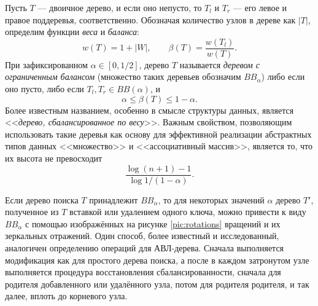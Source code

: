 \documentclass[a4paper,14pt]{extarticle}
\begin{document}
Пусть \( T \) --- двоичное дерево,
и  если оно непусто, то
\( T_l \) и \( T_r \) ---
его левое и правое поддеревья, соответственно.
Обозначая количество узлов в дереве как \( |T| \),
определим функции \emph{веса} и \emph{баланса}:
\begin{equation}
  w(T) = 1 + |W|, \qquad
  \beta(T) = \frac{w(T_l)}{w(T)}.
\end{equation}
При зафиксированном \( \alpha \in [0, 1/2] \),
дерево \( T \) называется
\emph{деревом с ограниченным балансом}
(множество таких деревьев обозначим \( BB_\alpha \))
либо если оно пусто,
либо если \( T_l, T_r \in BB(\alpha) \),
и
\begin{equation}
  \label{eqn:beta}
  \alpha \leqslant \beta(T) \leqslant 1 - \alpha.
\end{equation}
Более известным названием,
особенно в смысле структуры данных,
является <<\emph{дерево, сбалансированное по весу}>>.
Важным свойством,
позволяющим использовать такие деревья
как основу для эффективной реализации
абстрактных типов данных <<множество>> и <<ассоциативный массив>>,
является то, что их высота не превосходит\cite{nievergelt}
\begin{equation}
  \frac{\log (n + 1) - 1}{\log 1/(1 - \alpha)}.
\end{equation}

Если дерево поиска \( T \)
принадлежит \( BB_\alpha \),
то для некоторых значений \( \alpha \)
дерево \( T' \),
полученное из \( T \) вставкой или удалением одного ключа,
можно привести к виду \( BB_\alpha \)
с помощью изображённых на рисунке \ref{pic:rotations}
вращений и их зеркальных отражений.
Один способ, более известный и исследованный,
аналогичен определению операций для АВЛ-дерева.
Сначала выполняется модификация
как для простого дерева поиска,
а после в каждом затронутом узле
выполняется процедура восстановления сбалансированности,
сначала для родителя добавленного или удалённого узла,
потом для родителя родителя,
и так далее, вплоть до корневого узла.
\end{document}
